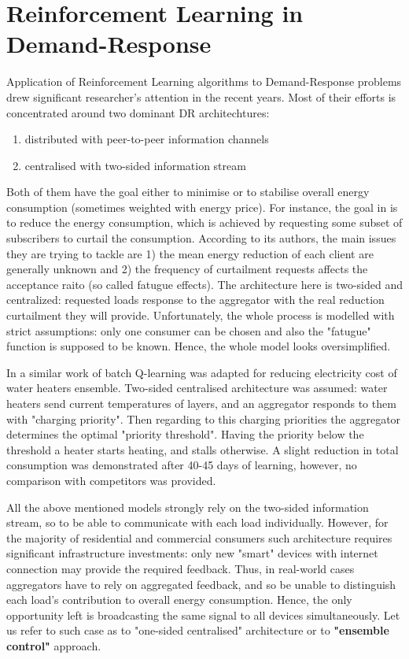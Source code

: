 \section{Reinforcement Learning in Demand-Response}
Application of Reinforcement Learning algorithms to Demand-Response problems drew significant researcher's attention in the recent years. Most of their efforts is concentrated around two dominant DR architechtures: 

\begin{enumerate}
    \item distributed with peer-to-peer information channels
    \item centralised with two-sided information stream
\end{enumerate} 

Both of them have the goal either to minimise or to stabilise overall energy consumption (sometimes weighted with energy price). For instance, the goal in \cite{Kalathil2015} is to reduce the energy consumption, which is achieved by requesting some subset of subscribers to curtail the consumption. According to its authors, the main issues they are trying to tackle are 1) the mean energy reduction of each client are generally unknown and 2) the frequency of curtailment requests affects the acceptance raito (so called fatugue effects). The architecture here is two-sided and centralized: requested loads response to the aggregator with the real reduction curtailment they will provide. Unfortunately, the whole process is modelled with strict assumptions: only one consumer can be chosen and also the "fatugue" function is supposed to be known. Hence, the whole model looks oversimplified. 

In a similar work of \cite{Ruelens2014} batch Q-learning was adapted for reducing electricity cost of water heaters ensemble. Two-sided centralised architecture was assumed: water heaters send current temperatures of layers, and an aggregator responds to them with "charging priority". Then regarding to this charging priorities the aggregator determines the optimal "priority threshold". Having the priority below the threshold a heater starts heating, and stalls otherwise. A slight reduction in total consumption was demonstrated after 40-45 days of learning, however, no comparison with competitors was provided. 

All the above mentioned models strongly rely on the two-sided information stream, so to be able to communicate with each load individually. However, for the majority of residential and commercial consumers such architecture requires significant infrastructure investments: only new "smart" devices with internet connection may provide the required feedback. Thus, in real-world cases aggregators have to rely on aggregated feedback, and so be unable to distinguish each load's contribution to overall energy consumption. Hence, the only opportunity left is broadcasting the same signal to all devices simultaneously. Let us refer to such case as to "one-sided centralised" architecture or to \textbf{"ensemble control"} approach.

